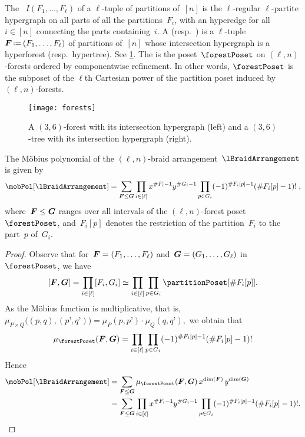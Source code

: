 \begin{remark}
\end{remark}

\begin{definition}
The ~$I(F_1, \dots, F_\ell)$ of a $\ell$-tuple of partitions of~$[n]$ is the $\ell$-regular $\ell$-partite hypergraph on all parts of all the partitions~$F_i$, with an hyperedge for all~$i \in [n]$ connecting the parts containing~$i$.
A  (resp.~) is a $\ell$-tuple~$\b{F} \eqdef (F_1, \dots, F_\ell)$ of partitions of~$[n]$ whose intersection hypergraph is a hyperforest (resp.~hypertree).
See \cref{fig:forests}.
The  is the poset~$\forestPoset$ on $(\ell,n)$-forests ordered by componentwise refinement.
In other words, $\forestPoset$ is the subposet of the $\ell$th Cartesian power of the partition poset induced by $(\ell,n)$-forests.
%
\begin{figure}
	\centerline{\texttt{[image: forests]}}
	\caption{A $(3,6)$-forest with its intersection hypergraph (left) and a $(3,6)$-tree with its intersection hypergraph (right).}
	\label{fig:forests}
\end{figure}
\end{definition}

\begin{theorem}
\label{thm:MobiusPolynomial}
The M\"obius polynomial of the $(\ell,n)$-braid arrangement~$\lBraidArrangement$ is given by
\[
\mobPol[\lBraidArrangement] = \sum_{\b{F} \le \b{G}} \prod_{i \in [\ell]} x^{\#F_i-1} y^{\#G_i-1} \prod_{p \in G_i} (-1)^{\#F_i[p]-1} (\# F_i[p]-1)! \; ,
\]
where~$\boldsymbol{F} \le \boldsymbol{G}$ ranges over all intervals of the $(\ell,n)$-forest poset~$\forestPoset$, and~$F_i[p]$ denotes the restriction of the partition~$F_i$ to the part~$p$ of~$G_i$.
\end{theorem}

\begin{proof}
Observe that for~$\boldsymbol{F} = (F_1, \dots, F_\ell)$ and~$\boldsymbol{G} = (G_1, \dots, G_\ell)$ in~$\forestPoset$, we have
\[
[\b{F}, \b{G}] = \prod_{i \in [\ell]} [F_i, G_i] \simeq \prod_{i \in [\ell]} \prod_{p \in G_i} \partitionPoset[{\#F_i[p]}].
\]
As the M\"obius function is multiplicative, that is,
\(
\mu_{P \times Q} \big( (p,q), (p’,q’) \big) = \mu_P(p,p’) \cdot \mu_Q(q,q’),
\)
we obtain that
\[
\mu_{\forestPoset}(\b{F}, \b{G}) = \prod_{i \in [\ell]} \prod_{p \in G_i} (-1)^{\#F_i[p]-1} (\# F_i[p]-1)!
\]
Hence
\begin{align*}
\mobPol[\lBraidArrangement] 
& = \sum_{\b{F} \le \b{G}} \mu_{\forestPoset}(\b{F}, \b{G}) \, x^{\dim(\b{F})} \, y^{\dim(\b{G})} \\
& = \sum_{\b{F} \le \b{G}} \prod_{i \in [\ell]} x^{\#F_i-1} y^{\#G_i-1} \prod_{p \in G_i} (-1)^{\#F_i[p]-1} (\# F_i[p]-1)!.
\qedhere
\end{align*}
\end{proof}

